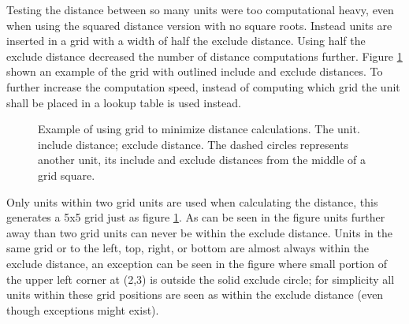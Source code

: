 Testing the distance between so many units were too computational heavy, even when using the squared distance version with no square roots. Instead units are inserted in a grid with a width of half the exclude distance. Using half the exclude distance decreased the number of distance computations further. Figure \ref{fig:player_squad_group_grid} shown an example of the grid with outlined include and exclude distances. To further increase the computation speed, instead of computing which grid the unit shall be placed in a lookup table is used instead.

\begin{figure}[htb]
\centering
{}
\caption[Minimizing distance calculation using grids]{
	Example of using grid to minimize distance calculations.
	\usebox{\LegendDotBlue} The unit.
	\usebox{\LegendCircleGreen} include distance;
	\usebox{\LegendCircleRed} exclude distance.
	The dashed circles represents another unit, its include and exclude distances from the middle of a grid square.}
\label{fig:player_squad_group_grid}
\end{figure}

Only units within two grid units are used when calculating the distance, this generates a 5x5 grid just as figure \ref{fig:player_squad_group_grid}. As can be seen in the figure units further away than two grid units can never be within the exclude distance. Units in the same grid or to the left, top, right, or bottom are almost always within the exclude distance, an exception can be seen in the figure where small portion of the upper left corner at (2,3) is outside the solid exclude circle; for simplicity all units within these grid positions are seen as within the exclude distance (even though exceptions might exist).

